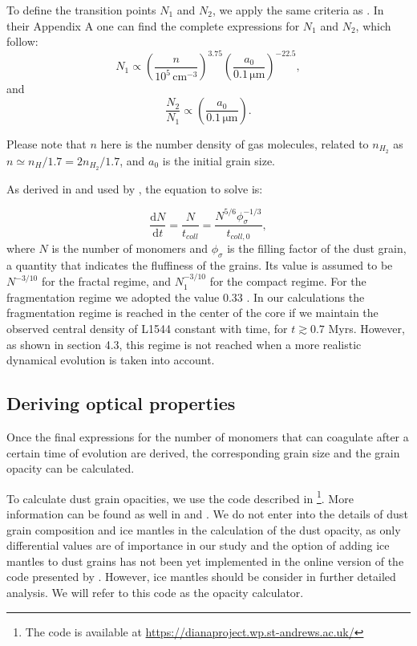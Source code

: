 \documentclass{aa}
\begin{document}
To define the transition points $N_1$ and $N_2$, we apply the same criteria as . In their Appendix A one can find the complete expressions for $N_1$ and $N_2$, which follow: 
\begin{equation}
N_1 \propto \left(\frac{n}{10^5 \, \mathrm{cm^{-3}}}\right)^{3.75}\left(\frac{a_0}{0.1 \, \mathrm{\mu m}}\right)^{-22.5} ,
\end{equation}
and
\begin{equation}
\frac{N_2}{N_1} \propto \left(\frac{a_0}{0.1 \, \mathrm{\mu m}}\right) .
\end{equation}

Please note that $n$ here is the number density of gas molecules, related to $n_{H_2}$ as $n \simeq n_H/1.7 = 2 n_{H_2}/1.7$, and $a_0$ is the initial grain size.  


As derived in  and used by , the equation to solve is:

\begin{equation}
\frac{\mathrm{d}N}{\mathrm{d}t} =  \frac{N}{t_{coll}} = \frac{N^{5/6} \phi_{\sigma}^{-1/3}}{t_{coll,0}} ,
\end{equation}
where $N$ is the number of monomers and $\phi_{\sigma}$ is the filling factor of the dust grain, a quantity that indicates the fluffiness of the grains. Its value is assumed to be $N^{-3/10}$ for the fractal regime, and $N_1^{-3/10}$ for the compact regime. For the fragmentation regime we adopted the value 0.33 . In our calculations the fragmentation regime is reached in the center of the core if we maintain the observed central density of L1544 constant with time, for $t\gtrsim0.7$ Myrs. However, as shown in section 4.3, this regime is not reached when a more realistic dynamical evolution is taken into account.

\subsection{Deriving optical properties}

Once the final expressions for the number of monomers that can coagulate after a certain time of evolution are derived, the corresponding grain size and the grain opacity can be calculated. 

To calculate dust grain opacities, we use the code described in \footnote{The code is available at \url{https://dianaproject.wp.st-andrews.ac.uk/}}. More information can be found as well in  and . We do not enter into the details of dust grain composition and ice mantles in the calculation of the dust opacity, as only differential values are of importance in our study and the option of adding ice mantles to dust grains has not been yet implemented in the online version of the code presented by . However, ice mantles should be consider in further detailed analysis. We will refer to this code as the opacity calculator.
\end{document}
